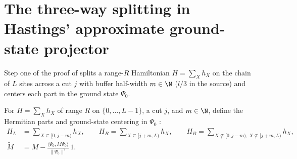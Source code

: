 \section{The three-way splitting in Hastings' approximate ground-state projector}
\label{sec:hastings_three_way_splitting}


Step one of the proof of \cite[Lemma~1]{Hastings2007AreaLaw} splits a range-$R$
Hamiltonian $H=\sum_Xh_X$ on the chain of $L$ sites across a cut $j$ with
buffer half-width $m\in\N$ ($l/3$ in the source) and centers each part in the
ground state $\Psi_0$.

\begin{definition}
    \label{def:hastings_three_way_splitting}
    \leanok
    For $H=\sum_Xh_X$ of range $R$ on $\{0,\dots,L-1\}$, a cut $j$, and
    $m\in\N$, define the Hermitian parts and ground-state centering in $\Psi_0$
    \cite[lines 774--782]{Hastings2007AreaLaw}:
    \begin{align}
        H_L          & =\sum_{X\subseteq\lbrack0,j-m)}h_X,\qquad
        H_R=\sum_{X\subseteq\lbrack j+m,L)}h_X,\qquad
        H_B=\sum_{X\not\subseteq\lbrack0,j-m),\,X\not\subseteq\lbrack j+m,L)}h_X,
        \label{eq:hastings_three_way_parts}                                     \\
        \widetilde M & =M-\frac{\langle\Psi_0,M\Psi_0\rangle}{\|\Psi_0\|^2}\,1.
        \label{eq:hastings_ground_centered}
    \end{align}
\end{definition}

